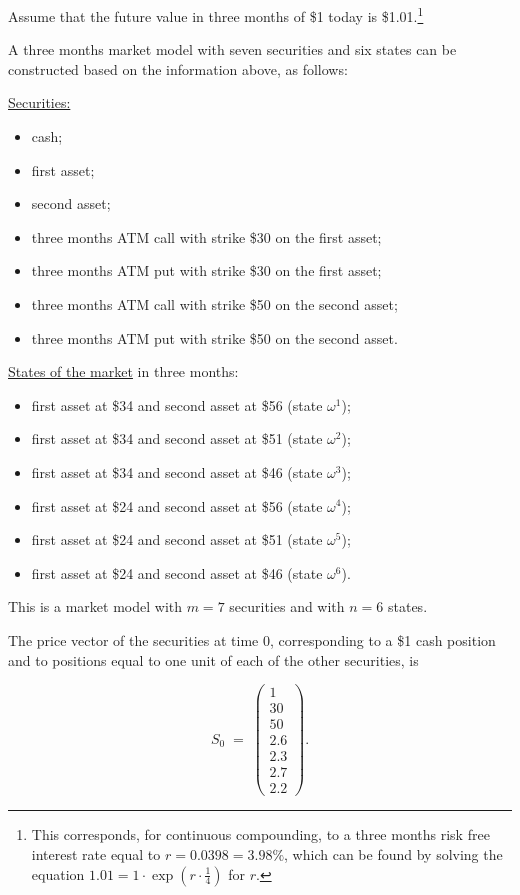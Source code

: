 Assume that the future value in three months of \$1 today is
\$1.01.\footnote{This corresponds, for continuous compounding, to a three
months risk free interest rate equal to $r=0.0398=3.98\%$, which can be
found by solving the equation $1.01 = 1\cdot\exp\left(r\cdot\frac{1}{4}\right)$
for $r$.}

A three months market model with seven securities and six states can be
constructed based on the information above, as follows:

\medskip
\noindent\underline{Securities:}
\begin{itemize}
\item cash;
\item first asset;
\item second asset;
\item three months ATM call with strike \$30 on the first asset;
\item three months ATM put with strike \$30 on the first asset;
\item three months ATM call with strike \$50 on the second asset;
\item three months ATM put with strike \$50 on the second asset.
\end{itemize}

\medskip
\noindent\underline{States of the market} in three months:
\begin{itemize}
\item first asset at \$34 and second asset at \$56 (state $\omega^1$);
\item first asset at \$34 and second asset at \$51 (state $\omega^2$);
\item first asset at \$34 and second asset at \$46 (state $\omega^3$);
\item first asset at \$24 and second asset at \$56 (state $\omega^4$);
\item first asset at \$24 and second asset at \$51 (state $\omega^5$);
\item first asset at \$24 and second asset at \$46 (state $\omega^6$).
\end{itemize}

This is a market model with $m=7$ securities and with $n=6$ states.

The price vector of the securities at time 0, corresponding to a \$1 cash
position and to positions equal to one unit of each of the other
securities, is

\begin{equation}
S_0 \;=\; \begin{pmatrix} 1 \\ 30 \\ 50 \\ 2.6 \\ 2.3 \\ 2.7 \\ 2.2 \end{pmatrix}.
\end{equation}

